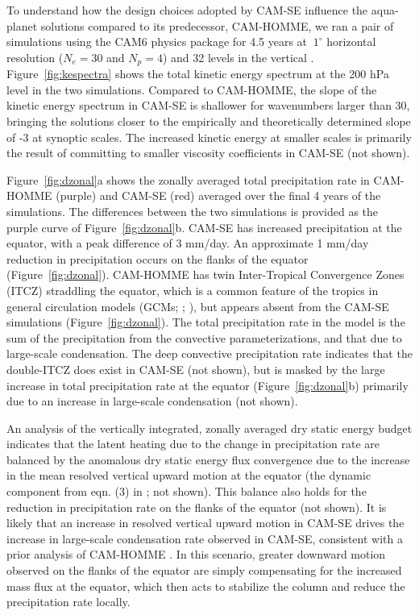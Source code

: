 \documentclass{agujournal}
\begin{document}
To understand how the design choices adopted by CAM-SE influence the aqua-planet solutions compared to its predecessor, CAM-HOMME, we ran a pair of simulations using the CAM6 physics package for 4.5 years at $~1^\circ$ horizontal resolution ($N_e=30$ and $N_p=4$) and 32 levels in the vertical {\color{red}{(model top is at approximately 3.6Pa)}}. Figure~\ref{fig:kespectra} shows the total kinetic energy spectrum at the 200 hPa level in the two simulations. Compared to CAM-HOMME, the slope of the kinetic energy spectrum in CAM-SE is shallower for wavenumbers larger than 30, bringing the solutions closer to the empirically \citep{NG1985JAS} and theoretically \citep{C1971JAS} determined slope of -3 at synoptic scales. The increased kinetic energy at smaller scales is primarily the result of committing to smaller viscosity coefficients in CAM-SE (not shown).

Figure~\ref{fig:dzonal}a shows the zonally averaged total precipitation rate in CAM-HOMME (purple) and CAM-SE (red) averaged over the final 4 years of the simulations. The differences between the two simulations is provided as the purple curve of Figure~\ref{fig:dzonal}b. CAM-SE has increased precipitation at the equator, with a peak difference of 3 mm/day. An approximate 1 mm/day reduction in precipitation occurs on the flanks of the equator (Figure~\ref{fig:dzonal}). CAM-HOMME has twin Inter-Tropical Convergence Zones (ITCZ) straddling the equator, which is a common feature of the tropics in general circulation models (GCMs; \cite{BGN2010JCLIM}; \cite{MWO2016JAMES}), but appears absent from the CAM-SE simulations (Figure~\ref{fig:dzonal}). The total precipitation rate in the model is the sum of the precipitation from the convective parameterizations, and that due to large-scale condensation. The deep convective precipitation rate indicates that the double-ITCZ does exist in CAM-SE (not shown), but is masked by the large increase in total precipitation rate at the equator (Figure~\ref{fig:dzonal}b) primarily due to an increase in large-scale condensation (not shown).

An analysis of the vertically integrated, zonally averaged dry static energy budget indicates that the latent heating due to the change in precipitation rate are balanced by the anomalous dry static energy flux convergence due to the increase in the mean resolved vertical upward motion at the equator (the dynamic component from eqn. (3) in \cite{MO2011NATUREC}; not shown). This balance also holds for the reduction in precipitation rate on the flanks of the equator (not shown). It is likely that an increase in resolved vertical upward motion in CAM-SE drives the increase in large-scale condensation rate observed in CAM-SE, consistent with a prior analysis of CAM-HOMME \citep{OETAL2016JAMES}. In this scenario, greater downward motion observed on the flanks of the equator are simply compensating for the increased mass flux at the equator, which then acts to stabilize the column and reduce the precipitation rate locally.
\end{document}
